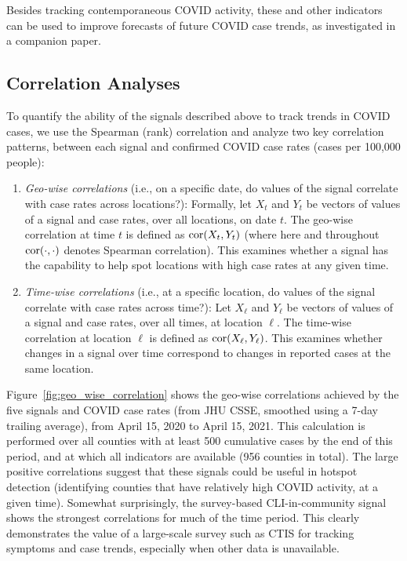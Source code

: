 \documentclass[9pt,twocolumn,twoside,lineno]{pnas-new}
\begin{document}
Besides tracking contemporaneous COVID activity, these and other indicators can
be used to improve forecasts of future COVID case trends, as investigated in a
companion paper.

\subsection{Correlation Analyses}

To quantify the ability of the signals described above to track trends in COVID
cases, we use the Spearman (rank) correlation and analyze two key correlation
patterns, between each signal and confirmed COVID case rates (cases per 100,000
people):

\begin{enumerate}
\item \textit{Geo-wise correlations} (i.e., on a specific date, do values of the
  signal correlate with case rates across locations?): Formally, let $X_t$ and
  $Y_t$ be vectors of values of a signal and case rates, over all locations, on
  date $t$. The geo-wise correlation at time $t$ is defined as $\mathrm{cor}(X_t, 
  Y_t)$ (where here and throughout $\mathrm{cor}(\cdot,\cdot)$ denotes Spearman 
  correlation). This examines whether a signal has the capability to help spot
  locations with high case rates at any given time.  

\item \textit{Time-wise correlations} (i.e., at a specific location, do values
  of the signal correlate with case rates across time?): Let $X_\ell$
  and $Y_\ell$ be vectors of values of a signal and case rates, over all
  times, at location $\ell$. The time-wise correlation at location $\ell$ is
  defined as $\mathrm{cor}(X_\ell, Y_\ell)$. This examines whether changes in a signal
  over time correspond to changes in reported cases at the same 
  location.
\end{enumerate}

Figure~\ref{fig:geo_wise_correlation} shows the geo-wise correlations achieved
by the five signals and COVID case rates (from JHU CSSE, smoothed using a 7-day
trailing average), from April 15, 2020 to April 15, 2021. This calculation is
performed over all counties with at least 500 cumulative cases by the end of
this period, and at which all indicators are available (956 counties in
total). The large positive correlations suggest that these signals could be
useful in hotspot detection (identifying counties that have relatively high
COVID activity, at a given time). Somewhat surprisingly, the survey-based 
CLI-in-community signal shows the strongest correlations for much of the time
period. This clearly demonstrates the value of a large-scale survey such as CTIS
for tracking symptoms and case trends, especially when other data is unavailable.
\end{document}
